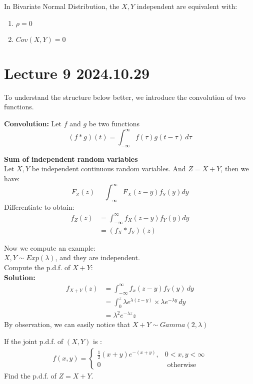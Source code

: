 \documentclass{article}
\begin{document}
\begin{theorem}
    In Bivariate Normal Distribution, the $X,Y$ independent are equivalent with:
    \begin{enumerate}
        \item $\rho = 0$
        \item $Cov(X,Y) = 0$
    \end{enumerate}
\end{theorem}
\section{Lecture 9 2024.10.29}
To understand the structure below better, we introduce the convolution of two functions. 
\begin{definition}
    \textbf{Convolution:}
    Let $f$ and $g$ be two functions 
    \begin{equation}
    (f * g)(t) = \int_{-\infty}^{\infty} f(\tau) g(t - \tau) \, d\tau
    \end{equation}
\end{definition}
\begin{theorem}
    \textbf{Sum of independent random variables}\\
    Let $X,Y$ be independent continuous random variables. And $Z = X + Y$, then we have:
    \begin{equation*}
        F_Z(z) = \int^\infty_{-\infty}F_X(z-y)f_Y(y) dy
    \end{equation*}
    Differentiate to obtain:
    \begin{align*}
        f_Z(z) &= \int^\infty_{-\infty}f_X(z-y)f_Y(y) dy \\
               &= (f_X * f_Y)(z)
    \end{align*}
\end{theorem}
Now we compute an example:\\
$X,Y \sim Exp(\lambda)$, and they are independent.\\
Compute the p.d.f. of $X+Y$: \\
\textbf{Solution:}
\begin{align*}
    f_{X+Y}(z)  &= \int^\infty_{-\infty}f_x(z-y)f_Y(y) \, dy \\
                &= \int^z_{0}\lambda e^{\lambda(z-y)} \times \lambda e^{-\lambda y} \, dy \\
                &= \lambda^2 e^{-\lambda z} z
\end{align*}
By observation, we can easily notice that $X + Y \sim Gamma(2, \lambda)$
\begin{quiz}
    If the joint p.d.f. of $(X,Y)$ is :
    \begin{align*}
        f(x,y) = 
        \begin{cases}
            \frac{1}{2}(x+y)e^{-(x+y)}, & 0 < x,y < \infty \\
            0 & \text{ otherwise}
        \end{cases}
    \end{align*}
    Find the p.d.f. of $Z = X+Y$.
\end{quiz}
\end{document}
